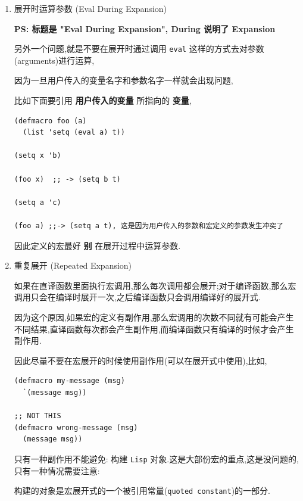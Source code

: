\documentclass[11pt]{article}
\begin{document}
\begin{enumerate}
如果不进行绑定的话,这种 \texttt{symbol} 就没法引用了.

可以利用这特性来解决上面的问题,

\begin{verbatim}
(defmacro for (var from init to final do &rest body)
  (let ((tempvar (make-symbol "max")))
    `(let ((,var ,init)
           (,tempvar ,final))
       (while (<= ,var ,tempvar)
         ,@body
         (setq ,var (1+ ,var))))))
\end{verbatim}

\texttt{uninterned symbol} \texttt{max} (make-symbol 生成的 \texttt{max}) 不会和 \texttt{interned symbol} \texttt{max} (用户定义的 \texttt{max}) 发生冲突.


\item 展开时运算参数 (Eval During Expansion)
\label{sec:org2e0a2b7}

\textbf{PS: 标题是 "Eval During Expansion", During 说明了 Expansion}

另外一个问题,就是不要在展开时通过调用 \texttt{eval} 这样的方式去对参数(arguments)进行运算,

因为一旦用户传入的变量名字和参数名字一样就会出现问题,

比如下面要引用 \textbf{用户传入的变量} 所指向的 \textbf{变量},

\begin{verbatim}
(defmacro foo (a)
  (list 'setq (eval a) t))

(setq x 'b)

(foo x)  ;; -> (setq b t)

(setq a 'c)

(foo a) ;;-> (setq a t), 这是因为用户传入的参数和宏定义的参数发生冲突了
\end{verbatim}

因此定义的宏最好 \textbf{别} 在展开过程中运算参数.


\item 重复展开 (Repeated Expansion)
\label{sec:org1445e1d}

如果在直译函数里面执行宏调用,那么每次调用都会展开;对于编译函数,那么宏调用只会在编译时展开一次,之后编译函数只会调用编译好的展开式.

因为这个原因,如果宏的定义有副作用,那么宏调用的次数不同就有可能会产生不同结果,直译函数每次都会产生副作用,而编译函数只有编译的时候才会产生副作用.

因此尽量不要在宏展开的时候使用副作用(可以在展开式中使用),比如,

\begin{verbatim}
(defmacro my-message (msg)
  `(message msg))

;; NOT THIS
(defmacro wrong-message (msg)
  (message msg))
\end{verbatim}

只有一种副作用不能避免: 构建 \texttt{Lisp} 对象.这是大部份宏的重点,这是没问题的,只有一种情况需要注意:

构建的对象是宏展开式的一个被引用常量(\texttt{quoted constant})的一部分.
\end{enumerate}
\end{document}
